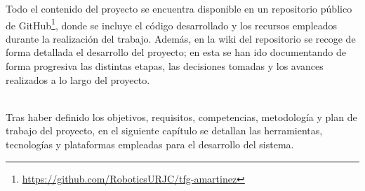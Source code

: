 Todo el contenido del proyecto se encuentra disponible en un repositorio público de GitHub\footnote{\url{https://github.com/RoboticsURJC/tfg-amartinez}}, donde se incluye el código desarrollado y los recursos empleados durante la realización del trabajo. Además, en la wiki del repositorio se recoge de forma detallada el desarrollo del proyecto; en esta se han ido documentando de forma progresiva las distintas etapas, las decisiones tomadas y los avances realizados a lo largo del proyecto.\\

\

Tras haber definido los objetivos, requisitos, competencias, metodología y plan de trabajo del proyecto, en el siguiente capítulo se detallan las herramientas, tecnologías y plataformas empleadas para el desarrollo del sistema.

